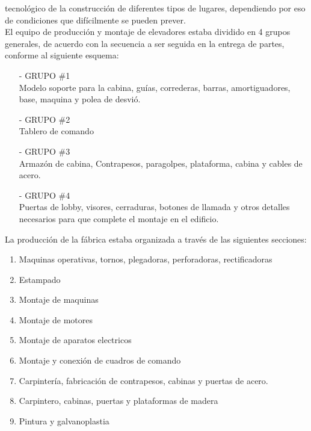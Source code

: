\documentclass[a4paper,10pt,titlepage]{article}
\begin{document}
tecnol\'ogico de la construcci\'on de diferentes tipos de lugares, dependiendo por eso de
condiciones que dif\'icilmente se pueden prever.\\
El equipo de producci\'on y montaje de elevadores estaba dividido en 4 grupos
generales, de acuerdo con la secuencia a ser seguida en la entrega de partes,
conforme al siguiente esquema:\\
\begin{itemize}
 \item[-] GRUPO \#1\\
Modelo soporte para la cabina, gu\'ias, correderas, barras, amortiguadores, base,
maquina y polea de desvi\'o.
\item[-] GRUPO \#2\\
Tablero de comando
\item[-] GRUPO \#3\\
Armaz\'on de cabina, Contrapesos, paragolpes, plataforma, cabina y cables de acero.
\item[-] GRUPO \#4\\
Puertas de lobby, visores, cerraduras, botones de llamada y otros detalles necesarios
para que complete el montaje en el edificio.
\end{itemize}

La producci\'on de la f\'abrica estaba organizada a trav\'es de las siguientes secciones:
\begin{enumerate}
 \item Maquinas operativas, tornos, plegadoras, perforadoras, rectificadoras
 \item Estampado
 \item Montaje de maquinas
 \item Montaje de motores
 \item Montaje de aparatos electricos
 \item Montaje y conexi\'on de cuadros de comando
 \item Carpinter\'ia, fabricaci\'on de contrapesos, cabinas y puertas de acero.
 \item Carpintero, cabinas, puertas y plataformas de madera
 \item Pintura y galvanoplastia
\end{enumerate}
\end{document}
